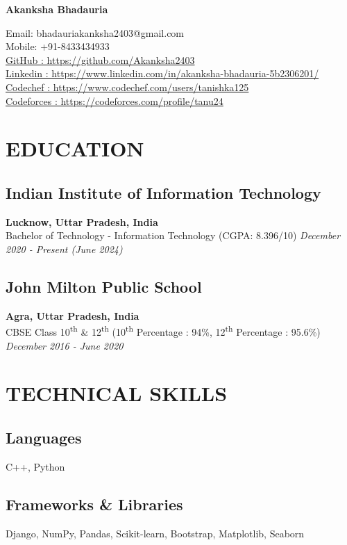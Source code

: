 \documentclass[12pt]{article}
\newcommand{\resumename}[1]{\LARGE\textbf{#1} \hfill \small}
\begin{document}
\noindent
\resumename{Akanksha Bhadauria} \raggedright Email: bhadauriakanksha2403@gmail.com \\
\hfill Mobile: +91-8433434933 \\
\href{https://github.com/Akanksha2403}{GitHub : https://github.com/Akanksha2403} \\
\href{https://www.linkedin.com/in/akanksha-bhadauria-5b2306201/}{Linkedin : https://www.linkedin.com/in/akanksha-bhadauria-5b2306201/} \\
\href{https://www.codechef.com/users/prabhav7}{Codechef : https://www.codechef.com/users/tanishka125} \\
\href{https://codeforces.com/profile/tanu24}{Codeforces : https://codeforces.com/profile/tanu24} 
\section*{EDUCATION}
\subsection*{Indian Institute of Information Technology}      \hfill \textbf{Lucknow, Uttar Pradesh, India} \\
Bachelor of Technology - Information Technology (CGPA: 8.396/10) \hfill \textit{December 2020 - Present (June 2024)} \\
\subsection*{John Milton Public School}                       \hfill \textbf{Agra, Uttar Pradesh, India} \\
CBSE Class 10\textsuperscript{th} \& 12\textsuperscript{th} (10\textsuperscript{th} Percentage : 94\%, 12\textsuperscript{th} Percentage : 95.6\%) \hfill \textit{December 2016 - June 2020} \\ 
\section*{TECHNICAL SKILLS}
\subsection*{Languages}               \hspace*{4.4cm} C++, Python \\
\subsection*{Frameworks \& Libraries} \hspace*{1.74cm} Django, NumPy, Pandas, Scikit-learn, Bootstrap, Matplotlib, Seaborn\\
\end{document}

